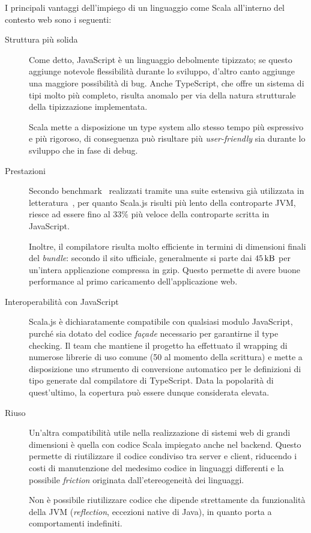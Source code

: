       I principali vantaggi dell'impiego di un linguaggio come Scala all'interno del contesto web sono i seguenti:
      \begin{description}
        \item[Struttura più solida]
          Come detto, JavaScript è un linguaggio debolmente tipizzato;
          se questo aggiunge notevole flessibilità durante lo sviluppo, d'altro canto aggiunge una maggiore possibilità di bug.
          Anche TypeScript, che offre un sistema di tipi molto più completo, risulta anomalo per via della natura strutturale della tipizzazione implementata.

          Scala mette a disposizione un type system allo stesso tempo più espressivo e più rigoroso, di conseguenza può risultare più \emph{user-friendly} sia durante lo sviluppo che in fase di debug.

        \item[Prestazioni]
          Secondo benchmark~\cite{Doeraene:256862} realizzati tramite una suite estensiva già utilizzata in letteratura~\cite{10.1145/3093334.2989232}, per quanto Scala.js risulti più lento della controparte JVM, riesce ad essere fino al 33\% più veloce della controparte scritta in JavaScript.

          Inoltre, il compilatore risulta molto efficiente in termini di dimensioni finali del \emph{bundle}:
          secondo il sito ufficiale, generalmente si parte dai \(\SI{45}{\kilo\byte}\) per un'intera applicazione compressa in gzip.
          Questo permette di avere buone performance al primo caricamento dell'applicazione web.

        \item[Interoperabilità con JavaScript]
          Scala.js è dichiaratamente compatibile con qualsiasi modulo JavaScript, purché sia dotato del codice \emph{façade} necessario per garantirne il type checking.
          Il team che mantiene il progetto ha effettuato il wrapping di numerose librerie di uso comune (50 al momento della scrittura) e mette a disposizione uno strumento di conversione automatico per le definizioni di tipo generate dal compilatore di TypeScript.
          Data la popolarità di quest'ultimo, la copertura può essere dunque considerata elevata.

        \item[Riuso]
          Un'altra compatibilità utile nella realizzazione di sistemi web di grandi dimensioni è quella con codice Scala impiegato anche nel backend.
          Questo permette di riutilizzare il codice condiviso tra server e client,
          riducendo i costi di manutenzione del medesimo codice in linguaggi differenti e la possibile \emph{friction} originata dall'etereogeneità dei linguaggi.

          Non è possibile riutilizzare codice che dipende strettamente da funzionalità della JVM (\emph{reflection}, eccezioni native di Java), in quanto porta a comportamenti indefiniti.
      \end{description}

